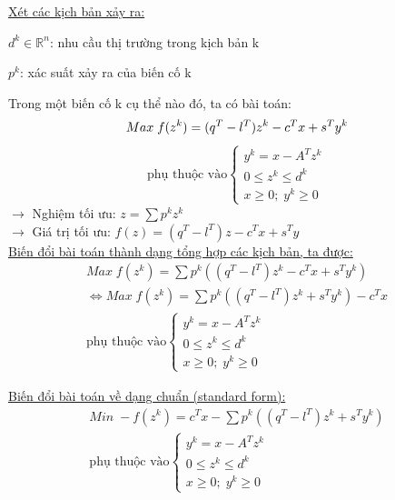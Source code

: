 \documentclass[a4paper]{article}
\begin{document}
        \underline{Xét các kịch bản xảy ra:}
            
        $d^k \in \mathbb{R}^n$: nhu cầu thị trường trong kịch bản k

        $p^k$: xác suất xảy ra của biến cố k

        Trong một biến cố k cụ thể nào đó, ta có bài toán:
        \begin{displaymath}
            Max \; f(z^k) = (q^T - l^T)z^k - c^Tx + s^Ty^k\\
        \end{displaymath}
        \begin{displaymath}
            \text{phụ thuộc vào}
            \begin{cases}
                y^k = x - A^Tz^k\\
                0 \leq z^k \leq d^k\\
                x \geq 0; \; y^k \geq 0
            \end{cases}
        \end{displaymath}
        \hspace*{1cm} $\rightarrow$ Nghiệm tối ưu: $z = \sum p^k z^k$\\
        \hspace*{1cm} $\rightarrow$ Giá trị tối ưu: $f(z) = (q^T - l^T)z - c^Tx + s^Ty$\\

        \underline{Biến đổi bài toán thành dạng tổng hợp các kịch bản, ta được:}
        \begin{gather*}
            Max \; f(z^k) = \sum p^k((q^T - l^T)z^k - c^Tx + s^Ty^k)\\
            \Longleftrightarrow Max \; f(z^k) = \sum p^k((q^T - l^T)z^k + s^Ty^k) - c^Tx\\
            \text{phụ thuộc vào}
            \begin{cases}
                y^k = x - A^Tz^k\\
                0 \leq z^k \leq d^k\\
                x \geq 0; \; y^k \geq 0
            \end{cases}
        \end{gather*}

        \underline{Biến đổi bài toán về dạng chuẩn (standard form):}
        \begin{gather*}
            Min \; -f(z^k) = c^Tx - \sum p^k((q^T - l^T)z^k + s^Ty^k)\\
            \text{phụ thuộc vào}
            \begin{cases}
                y^k = x - A^Tz^k\\
                0 \leq z^k \leq d^k\\
                x \geq 0; \; y^k \geq 0
            \end{cases}
        \end{gather*}
\end{document}
